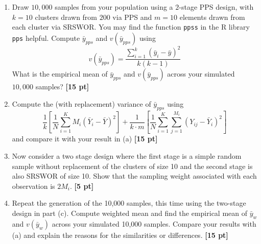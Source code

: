 \documentclass[12pt]{article}
\newcommand{\code}[1]{\texttt{#1}}
\begin{document}
\begin{enumerate}
	\begin{enumerate}[itemsep=5ex]
	\item Draw $10,000$ samples from your population using a $2$-stage PPS design, with $k=10$ clusters drawn from $200$ via PPS and $m=10$ elements drawn from each cluster via SRSWOR.  You may find the function \code{ppss} in the R library \code{pps} helpful.  Compute $\bar y_{pps}$ and $v(\bar y_{pps})$ using
	$$
	v(\bar y_{pps}) = \frac{\sum_{i=1}^k (\bar y_i - \bar y)^2}{k(k-1)}
	$$
	What is the empirical mean of $\bar y_{pps}$ and $v(\bar y_{pps})$ across your simulated $10,000$ samples? {\bf [15 pt]}
	\item Compute the (with replacement) variance of $\bar y_{pps}$ using
	$$
	\frac{1}{k} \left[ \frac{1}{N} \sum_{i=1}^K M_i (\bar Y_i - \bar Y)^2 \right] + \frac{1}{k \cdot m} \left[ \frac{1}{N} \sum_{i=1}^K \sum_{j=1}^{M_i} (Y_{ij} - \bar Y_i)^2 \right]
	$$
	and compare it with your result in (a) {\bf [15 pt]}
	\item Now consider a two stage design where the first stage is a simple random sample without replacement of the clusters of size 10 and the second stage is also SRSWOR of size 10. Show that the sampling weight associated with each observation is $2 M_i$. {\bf [5 pt]}
	\item Repeat the generation of the 10,000 samples, this time using the two-stage design in part (c). Compute weighted mean and find the empirical mean of $\bar y_{w}$ and $v(\bar y_w)$ across your simulated 10,000 samples. Compare your results with (a) and explain the reasons for the similarities or differences. {\bf [15 pt]}
	\end{enumerate}

\end{enumerate}
\end{document}
